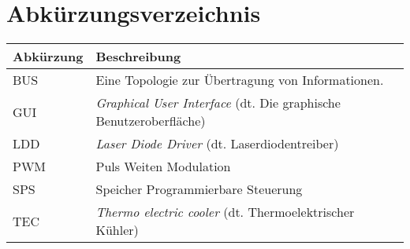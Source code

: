 \section*{Abkürzungsverzeichnis}

\begin{table}[H]
    \begin{tabular}{l|l}
         \textbf{Abkürzung}& \textbf{Beschreibung}\\
         \hline
         BUS&   Eine Topologie zur Übertragung von Informationen.\\         
         GUI&   \textit{Graphical User Interface} (dt. Die graphische Benutzeroberfläche)\\
         LDD&   \textit{Laser Diode Driver} (dt. Laserdiodentreiber)\\
         PWM&   Puls Weiten Modulation\\         
         SPS&   Speicher Programmierbare Steuerung\\
         TEC&   \textit{Thermo electric cooler} (dt. Thermoelektrischer Kühler)\\
    \end{tabular}
    \label{tab:abkuerzungen}
\end{table}

